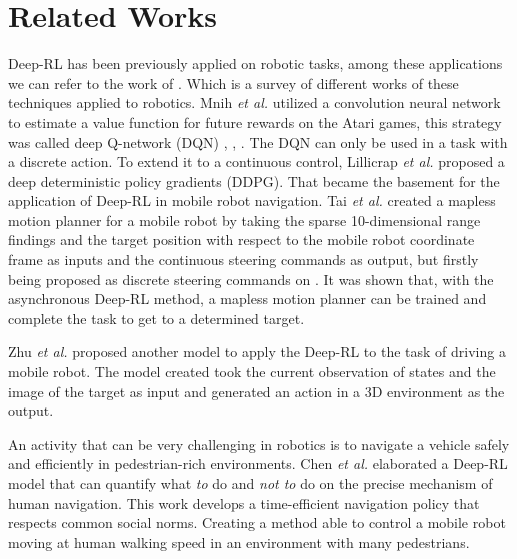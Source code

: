 \section*{Related Works}

Deep-RL has been previously applied on robotic tasks, among these applications we can refer to the work of \cite{kober2013reinforcement}.
Which is a survey of different works of these techniques applied to robotics.
Mnih \textit{et al.} \cite{mnih2013playing} utilized a convolution neural network to estimate a value function for future rewards on the Atari games, this strategy was called deep Q-network (DQN) \cite{mnih2013playing}, \cite{hausknecht2015deep}, \cite{van2016deep}.
The DQN can only be used in a task with a discrete action.
To extend it to a continuous control, Lillicrap \textit{et al.} \cite{lillicrap2015continuous} proposed a deep deterministic policy gradients (DDPG).
That became the basement for the application of Deep-RL in mobile robot navigation.
Tai \textit{et al.} \cite{tai2017virtual} created a mapless motion planner for a mobile robot by taking the sparse 10-dimensional range findings and the target position with respect to the mobile robot coordinate frame as inputs and the continuous steering commands as output, but firstly being proposed as discrete steering commands on \cite{tai2016towards}. It was shown that, with the asynchronous Deep-RL method, a mapless motion planner can be trained and complete the task to get to a determined target. 

Zhu \textit{et al.} \cite{zhu2017target} proposed another model to apply the Deep-RL to the task of driving a mobile robot.
The model created took the current observation of states and the image of the target as input and generated an action in a 3D environment as the output.

An activity that can be very challenging in robotics is to navigate a vehicle safely and efficiently in pedestrian-rich environments. Chen \textit{et al.} \cite{chen2017socially} elaborated a Deep-RL model that can quantify what \textit{to} do and \textit{not to} do on the precise mechanism of human  navigation.
This work develops a time-efficient navigation policy that respects common social norms.
Creating a method able to control a mobile robot moving at human walking speed in an environment with many pedestrians.